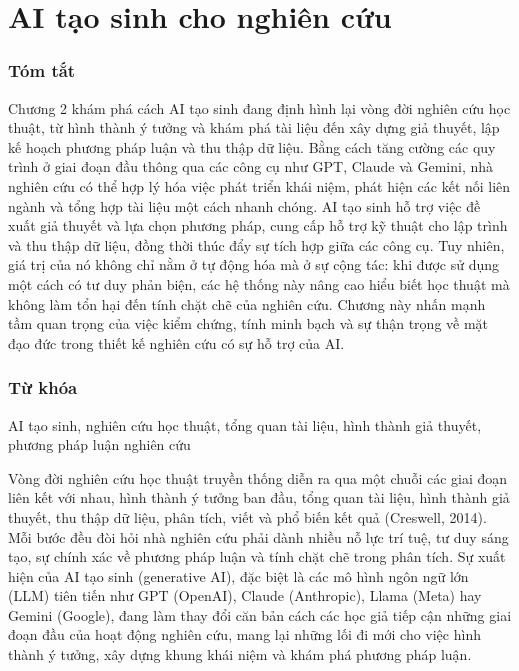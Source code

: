 \chapter{AI tạo sinh cho nghiên cứu}

\subsection{Tóm tắt}

Chương 2 khám phá cách AI tạo sinh đang định hình lại vòng đời nghiên cứu học thuật, từ hình thành ý tưởng và khám phá tài liệu đến xây dựng giả thuyết, lập kế hoạch phương pháp luận và thu thập dữ liệu. Bằng cách tăng cường các quy trình ở giai đoạn đầu thông qua các công cụ như GPT, Claude và Gemini, nhà nghiên cứu có thể hợp lý hóa việc phát triển khái niệm, phát hiện các kết nối liên ngành và tổng hợp tài liệu một cách nhanh chóng. AI tạo sinh hỗ trợ việc đề xuất giả thuyết và lựa chọn phương pháp, cung cấp hỗ trợ kỹ thuật cho lập trình và thu thập dữ liệu, đồng thời thúc đẩy sự tích hợp giữa các công cụ. Tuy nhiên, giá trị của nó không chỉ nằm ở tự động hóa mà ở sự cộng tác: khi được sử dụng một cách có tư duy phản biện, các hệ thống này nâng cao hiểu biết học thuật mà không làm tổn hại đến tính chặt chẽ của nghiên cứu. Chương này nhấn mạnh tầm quan trọng của việc kiểm chứng, tính minh bạch và sự thận trọng về mặt đạo đức trong thiết kế nghiên cứu có sự hỗ trợ của AI.

\subsection{Từ khóa}

AI tạo sinh, nghiên cứu học thuật, tổng quan tài liệu, hình thành giả thuyết, phương pháp luận nghiên cứu

Vòng đời nghiên cứu học thuật truyền thống diễn ra qua một chuỗi các giai đoạn liên kết với nhau, hình thành ý tưởng ban đầu, tổng quan tài liệu, hình thành giả thuyết, thu thập dữ liệu, phân tích, viết và phổ biến kết quả (Creswell, 2014). Mỗi bước đều đòi hỏi nhà nghiên cứu phải dành nhiều nỗ lực trí tuệ, tư duy sáng tạo, sự chính xác về phương pháp luận và tính chặt chẽ trong phân tích. Sự xuất hiện của AI tạo sinh (generative AI), đặc biệt là các mô hình ngôn ngữ lớn (LLM) tiên tiến như GPT (OpenAI), Claude (Anthropic), Llama (Meta) hay Gemini (Google), đang làm thay đổi căn bản cách các học giả tiếp cận những giai đoạn đầu của hoạt động nghiên cứu, mang lại những lối đi mới cho việc hình thành ý tưởng, xây dựng khung khái niệm và khám phá phương pháp luận.

